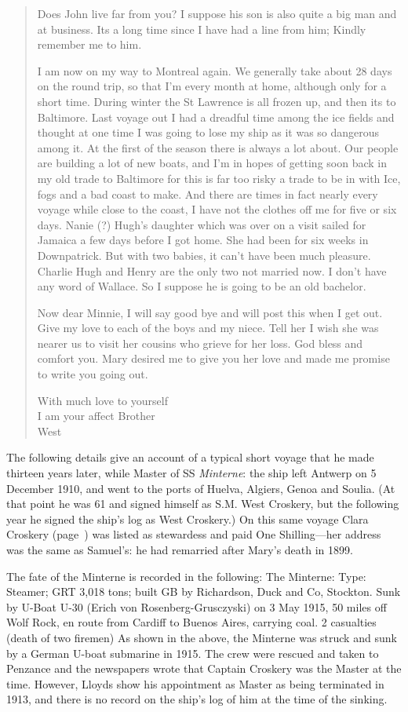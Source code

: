 \begin{quotation}
Does John live far from you? I suppose his son is also quite a big man and at business. Its a long time since I have had a line from him; Kindly remember me to him.

I am now on my way to Montreal again. We generally take about 28 days on the round trip, so that I'm every month at home, although only for a short time. During winter the St Lawrence is all frozen up, and then its to Baltimore. Last voyage out I had a dreadful time among the ice fields and thought at one time I was going to lose my ship as it was so dangerous among it. At the first of the season there is always a lot about. Our people are building a lot of new boats, and I'm in hopes of getting soon back in my old trade to Baltimore for this is far too risky a trade to be in with Ice, fogs and a bad coast to make. And there are times in fact nearly every voyage while close to the coast, I have not the clothes off me for five or six days. Nanie (?) Hugh's daughter which was over on a visit sailed for Jamaica a few days before I got home. She had been for six weeks in Downpatrick. But with two babies, it can't have been much pleasure. Charlie Hugh and Henry are the only two not married now. I don't have any word of Wallace. So I suppose he is going to be an old bachelor.

Now dear Minnie, I will say good bye and will post this when I get out. Give my love to each of the boys and my niece. Tell her I wish she was nearer us to visit her cousins who grieve for her loss. God bless and comfort you. Mary desired me to give you her love and made me promise to write you going out.

With much love to yourself \\
I am your affect Brother \\
West 
\end{quotation}

The following details give an account of a typical short voyage that he made thirteen years later, while Master of SS \emph{Minterne}: the ship left Antwerp on 5 December 1910, and went to the ports of Huelva, Algiers, Genoa and Soulia. (At that point he was 61 and signed himself as S.M. West Croskery, but the following year he signed the ship's log as West Croskery.) On this same voyage Clara Croskery (page~\pageref{Clara}) was listed as stewardess and paid One Shilling---her address was the same as Samuel's: he had remarried after Mary's death in 1899.

The fate of the Minterne is recorded in the following:
The Minterne: Type: Steamer; GRT 3,018 tons; built GB by Richardson, Duck and Co, Stockton. Sunk by U-Boat U-30 (Erich von Rosenberg-Grusczyski) on 3 May 1915, 50 miles off Wolf Rock, en route from Cardiff to Buenos Aires, carrying coal. 2 casualties (death of two firemen) \cite{uboat4174} As shown in the above, the Minterne was struck and sunk by a German U-boat submarine in 1915.  The crew were rescued and taken to Penzance and the newspapers wrote that Captain Croskery was the Master at the time. However, Lloyds show his appointment as Master as being terminated in 1913, and there is no record on the ship's log of him at the time of the sinking.

